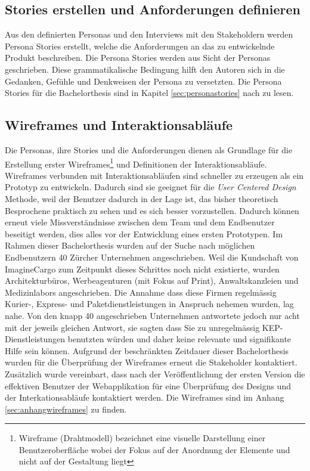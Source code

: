 \subsection{Stories erstellen und Anforderungen definieren}
Aus den definierten Personas und den Interviews mit den Stakeholdern werden Persona Stories erstellt, welche die Anforderungen an das zu entwickelnde Produkt beschreiben. Die Persona Stories werden aus Sicht der Personas geschrieben. Diese grammatikalische Bedingung hilft den Autoren sich in die Gedanken, Gefühle und Denkweisen der Persona zu versetzten. Die Persona Stories für die Bachelorthesis sind in Kapitel \ref{sec:personastories} nach zu lesen.

\subsection{Wireframes und Interaktionsabläufe}
Die Personas, ihre Stories und die Anforderungen dienen als Grundlage für die Erstellung erster Wireframes\footnote{ Wireframe (Drahtmodell) bezeichnet eine visuelle Darstellung einer Benutzeroberfläche wobei der Fokus auf der Anordnung der Elemente und nicht auf der Gestaltung liegt} und Definitionen der Interaktionsabläufe. Wireframes verbunden mit Interaktionsabläufen sind schneller zu erzeugen als ein Prototyp zu entwickeln. Dadurch sind sie geeignet für die \textit{User Centered Design} Methode, weil der Benutzer dadurch in der Lage ist, das bisher theoretisch Besprochene praktisch zu sehen und es sich besser vorzustellen. Dadurch können erneut viele Missverständnisse zwischen dem Team und dem Endbenutzer beseitigt werden, dies alles vor der Entwicklung eines ersten Prototypen. Im Rahmen dieser Bachelorthesis wurden auf der Suche nach möglichen Endbenutzern 40 Zürcher Unternehmen angeschrieben. Weil die Kundschaft von ImagineCargo zum Zeitpunkt dieses Schrittes noch nicht existierte, wurden Architekturbüros, Werbeagenturen (mit Fokus auf Print), Anwaltskanzleien und Medizinlabors angeschrieben. Die Annahme dass diese Firmen regelmässig Kurier-, Express- und Paketdienstleistungen in Anspruch nehemen wurden, lag nahe. Von den knapp 40 angeschrieben Unternehmen antwortete jedoch nur acht mit der jeweils gleichen Antwort, sie sagten dass Sie zu unregelmässig KEP-Dienstleistungen benutzten würden und daher keine relevante und signifikante Hilfe sein können. Aufgrund der beschränkten Zeitdauer dieser Bachelorthesis wurden für die Überprüfung der Wireframes erneut die Stakeholder kontaktiert. Zusätzlich wurde vereinbart, dass nach der Veröffentlichung der ersten Version die effektiven Benutzer der Webapplikation für eine Überprüfung des Designs und der Interkationsabläufe kontaktiert werden. Die Wireframes sind im Anhang \ref{sec:anhangwireframes} zu finden.

